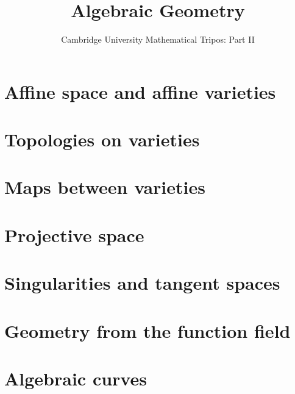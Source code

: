 \documentclass{article}
\title{Algebraic Geometry}
\author{Cambridge University Mathematical Tripos: Part II}
\begin{document}
\maketitle

\tableofcontentsnewpage{}


\section{Affine space and affine varieties}

\section{Topologies on varieties}

\section{Maps between varieties}

\section{Projective space}

\section{Singularities and tangent spaces}

\section{Geometry from the function field}

\section{Algebraic curves}

\end{document}
